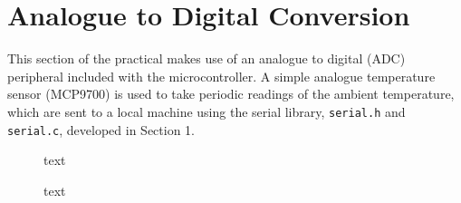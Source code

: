 \documentclass[a4paper]{article}
\begin{document}
\newpage

\section{Analogue to Digital Conversion}
This section of the practical makes use of an analogue to digital (ADC) peripheral included with the microcontroller. A simple analogue temperature sensor (MCP9700) is used to take periodic readings of the ambient temperature, which are sent to a local machine using the serial library, \verb|serial.h| and \verb|serial.c|, developed in Section 1. 
\vspace{1cm}
\begin{figure}[h]
	\centering
	\caption{text}
\end{figure}
\vspace{1cm}
\begin{figure}[h]
	\centering
	\caption{text}
\end{figure}
\end{document}
